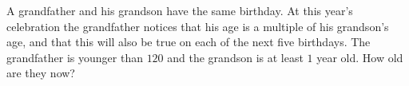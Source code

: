 A grandfather and his grandson have the same birthday. At this year's celebration the grandfather notices that his age is a multiple of his grandson's age, and that this will also be true on each of the next five birthdays. The grandfather is younger than $120$ and the grandson is at least $1$ year old. How old are they now?
